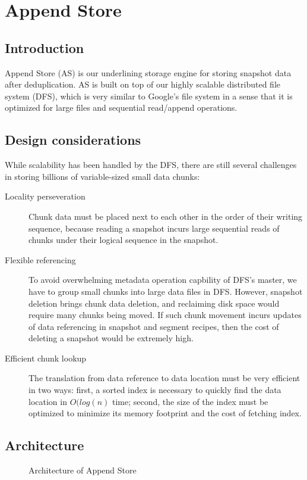 \section{Append Store}
\label{sect:append}
\subsection{Introduction}
Append Store (AS) is our underlining storage engine for storing snapshot data after deduplication. 
AS is built on top of our highly scalable distributed file system (DFS), 
which is very similar to Google's file system
in a sense that it is optimized for large files and sequential read/append operations.

\subsection{Design considerations}
While scalability has been handled by the DFS, there are still several challenges in 
storing billions of variable-sized small data chunks:
\begin{description}
\item[Locality perseveration] Chunk data must be placed next to each other in the order of their writing sequence,
because reading a snapshot incurs large sequential reads of chunks under their logical sequence in the snapshot.
\item[Flexible referencing] To avoid overwhelming metadata operation capbility of DFS's master, 
we have to group small chunks into large data files in DFS.
However, snapshot deletion brings chunk data deletion, and reclaiming disk space would require many chunks being moved.
If such chunk movement incurs updates of data referencing in snapshot and segment recipes, then the cost of deleting 
a snapshot would be extremely high.
\item[Efficient chunk lookup] The translation from data reference to data location must be very efficient in two ways: 
first, a sorted index is necessary to quickly find the data location in $O(log(n)$ time; 
second, the size of the index must be optimized to minimize its memory footprint and the cost of fetching index. 
\end{description}



\subsection{Architecture}
\begin{figure}[htbp]
  \centering
  \caption{Architecture of Append Store}
  \label{fig:as_arch}
\end{figure}

